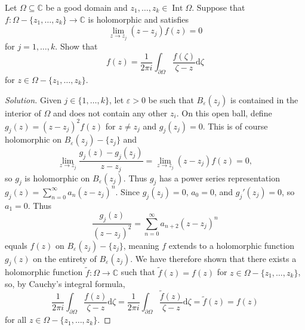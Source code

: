 \documentclass[10pt]{article}
\newcommand{\dd}{\mathrm{d}}
\providecommand{\eps}{\varepsilon}
\providecommand{\CC}{\mathbb C}
\newenvironment{soln}{\begin{proof}[Solution]}{\end{proof}}
\begin{document}
\begin{problem}
    Let $\Omega\subseteq\CC$ be a good domain
    and $z_1,\dots,z_k\in\operatorname{Int}\Omega$.
    Suppose that $f\colon\Omega - \{z_1,\dots,z_k\}\to\CC$
    is holomorphic and satisfies
    \begin{equation*}
	\lim_{z\to z_j} (z-z_j) f(z) = 0
    \end{equation*}
    for $j = 1,\dots,k$. Show that
    \begin{equation*}
	f(z) = \frac 1{2\pi i}\int_{\partial\Omega}
	\frac{f(\zeta)}{\zeta-z}\dd\zeta
    \end{equation*}
    for $z\in\Omega-\{z_1,\dots,z_k\}$.
\end{problem}

\begin{soln}
    Given $j\in\{1,\dots,k\}$, let $\eps>0$ be such that
    $B_\eps(z_j)$ is contained in the interior of $\Omega$
    and does not contain any other $z_i$.
    On this open ball, define $g_j(z) = (z-z_j)^2f(z)$
    for $z\ne z_j$ and $g_j(z_j) = 0$.
    This is of course holomorphic on $B_\eps(z_j) - \{z_j\}$ and
    \begin{equation*}
	\lim_{z\to z_j} \frac{g_j(z) - g_j(z_j)}{z - z_j}
	= \lim_{z\to z_j} (z-z_j)f(z) = 0,
    \end{equation*}
    so $g_j$ is holomorphic on $B_\eps(z_j)$.
    Thus $g_j$ has a power series representation
    $g_j(z) = \sum_{n=0}^\infty a_n(z-z_j)^n$.
    Since $g_j(z_j) = 0$, $a_0 = 0$,
    and $g_j'(z_j) = 0$, so $a_1 = 0$. Thus
    \begin{equation*}
	\frac{g_j(z)}{(z-z_j)^2}
	= \sum_{n=0}^\infty a_{n+2}(z-z_j)^n
    \end{equation*}
    equals $f(z)$ on $B_\eps(z_j) - \{z_j\}$,
    meaning $f$ extends to a holomorphic function $g_j(z)$
    on the entirety of $B_\eps(z_j)$.
    We have therefore shown that there exists a holomorphic function
    $\tilde f\colon\Omega\to\CC$ such that
    $\tilde f(z) = f(z)$ for $z\in\Omega-\{z_1,\dots,z_k\}$,
    so, by Cauchy's integral formula,
    \begin{equation*}
	\frac 1{2\pi i} \int_{\partial\Omega}
	\frac{f(z)}{\zeta-z}\dd\zeta
	= \frac 1{2\pi i} \int_{\partial\Omega}
	\frac{\tilde f(z)}{\zeta-z}\dd\zeta
	= \tilde f(z) = f(z)
    \end{equation*}
    for all $z\in\Omega-\{z_1,\dots,z_k\}$.
\end{soln}
\end{document}
